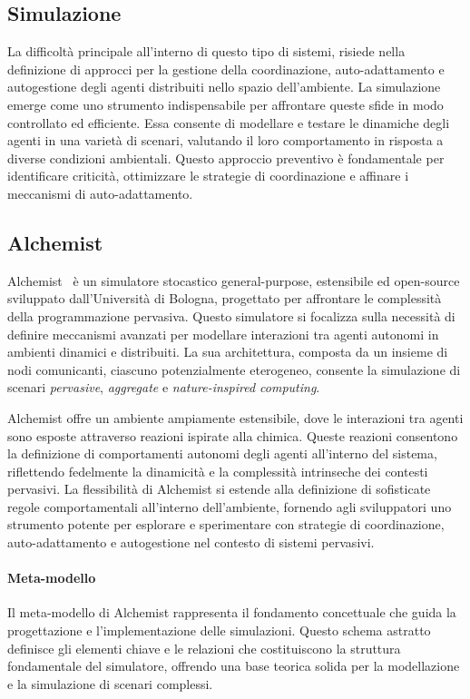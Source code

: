 \subsection{Simulazione}\label{ssec:simulation}
La difficoltà principale all'interno di questo tipo di sistemi, risiede nella definizione di approcci per la gestione della coordinazione, auto-adattamento
e autogestione degli agenti distribuiti nello spazio dell'ambiente. 
La simulazione emerge come uno strumento indispensabile per affrontare queste sfide in modo controllato ed efficiente. Essa consente di modellare e testare
le dinamiche degli agenti in una varietà di scenari, valutando il loro comportamento in risposta a diverse condizioni ambientali. Questo approccio
preventivo è fondamentale per identificare criticità, ottimizzare le strategie di coordinazione e affinare i meccanismi di auto-adattamento.

\subsection{Alchemist}\label{ssec:alchemist}
Alchemist~\cite{alchemist} è un simulatore stocastico general-purpose, estensibile ed open-source sviluppato dall'Università di Bologna, progettato
per affrontare le complessità della programmazione pervasiva. Questo simulatore si focalizza sulla necessità di definire meccanismi avanzati per modellare
interazioni tra agenti autonomi in ambienti dinamici e distribuiti. La sua architettura, composta da un insieme di nodi comunicanti, ciascuno
potenzialmente eterogeneo, consente la simulazione di scenari \textit{pervasive}, \textit{aggregate} e \textit{nature-inspired computing}.

Alchemist offre un ambiente ampiamente estensibile, dove le interazioni tra agenti sono esposte attraverso reazioni ispirate alla chimica. Queste reazioni
consentono la definizione di comportamenti autonomi degli agenti all'interno del sistema, riflettendo fedelmente la dinamicità e la complessità intrinseche
dei contesti pervasivi. La flessibilità di Alchemist si estende alla definizione di sofisticate regole comportamentali all'interno dell'ambiente,
fornendo agli sviluppatori uno strumento potente per esplorare e sperimentare con strategie di coordinazione, auto-adattamento e autogestione nel contesto di
sistemi pervasivi.

\paragraph{Meta-modello} Il meta-modello di Alchemist rappresenta il fondamento concettuale che guida la progettazione e l'implementazione delle simulazioni. Questo
schema astratto definisce gli elementi chiave e le relazioni che costituiscono la struttura fondamentale del simulatore, offrendo una base teorica solida per
la modellazione e la simulazione di scenari complessi.

